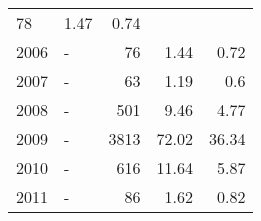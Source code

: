 \begin{longtable}{lXrrr}
       \num{78} &
       \num[round-mode=places,round-precision=2]{1.47} &
         \num[round-mode=places,round-precision=2]{0.74} \\

     2006 &
     \multicolumn{1}{X}{ -  } &


       \num{76} &
       \num[round-mode=places,round-precision=2]{1.44} &
         \num[round-mode=places,round-precision=2]{0.72} \\

     2007 &
     \multicolumn{1}{X}{ -  } &


       \num{63} &
       \num[round-mode=places,round-precision=2]{1.19} &
         \num[round-mode=places,round-precision=2]{0.6} \\

     2008 &
     \multicolumn{1}{X}{ -  } &


       \num{501} &
       \num[round-mode=places,round-precision=2]{9.46} &
         \num[round-mode=places,round-precision=2]{4.77} \\

     2009 &
     \multicolumn{1}{X}{ -  } &


       \num{3813} &
       \num[round-mode=places,round-precision=2]{72.02} &
         \num[round-mode=places,round-precision=2]{36.34} \\

     2010 &
     \multicolumn{1}{X}{ -  } &


       \num{616} &
       \num[round-mode=places,round-precision=2]{11.64} &
         \num[round-mode=places,round-precision=2]{5.87} \\

     2011 &
     \multicolumn{1}{X}{ -  } &


       \num{86} &
       \num[round-mode=places,round-precision=2]{1.62} &
         \num[round-mode=places,round-precision=2]{0.82} \\


\end{longtable}
